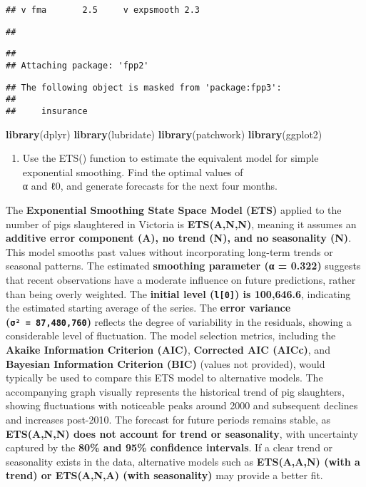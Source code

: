 \documentclass[
]{article}
\newenvironment{Shaded}{\begin{snugshade}}{\end{snugshade}}
\newcommand{\FunctionTok}[1]{\textcolor[rgb]{0.13,0.29,0.53}{\textbf{#1}}}
\newcommand{\NormalTok}[1]{#1}
\providecommand{\tightlist}{%
  \setlength{\itemsep}{0pt}\setlength{\parskip}{0pt}}
\begin{document}
\begin{verbatim}
## v fma       2.5     v expsmooth 2.3
\end{verbatim}

\begin{verbatim}
## 
\end{verbatim}

\begin{verbatim}
## 
## Attaching package: 'fpp2'
\end{verbatim}

\begin{verbatim}
## The following object is masked from 'package:fpp3':
## 
##     insurance
\end{verbatim}

\begin{Shaded}
\begin{Highlighting}[]
\FunctionTok{library}\NormalTok{(dplyr)}
\FunctionTok{library}\NormalTok{(lubridate)}
\FunctionTok{library}\NormalTok{(patchwork)}
\FunctionTok{library}\NormalTok{(ggplot2)}
\end{Highlighting}
\end{Shaded}

\begin{enumerate}
\def\labelenumi{\alph{enumi}.}
\tightlist
\item
  Use the ETS() function to estimate the equivalent model for simple
  exponential smoothing. Find the optimal values of\\
  α and ℓ0, and generate forecasts for the next four months.
\end{enumerate}

The \textbf{Exponential Smoothing State Space Model (ETS)} applied to
the number of pigs slaughtered in Victoria is \textbf{ETS(A,N,N)},
meaning it assumes an \textbf{additive error component (A), no trend
(N), and no seasonality (N)}. This model smooths past values without
incorporating long-term trends or seasonal patterns. The estimated
\textbf{smoothing parameter (α = 0.322)} suggests that recent
observations have a moderate influence on future predictions, rather
than being overly weighted. The \textbf{initial level
(\texttt{l{[}0{]}}) is 100,646.6}, indicating the estimated starting
average of the series. The \textbf{error variance
(\texttt{σ²\ =\ 87,480,760})} reflects the degree of variability in the
residuals, showing a considerable level of fluctuation. The model
selection metrics, including the \textbf{Akaike Information Criterion
(AIC)}, \textbf{Corrected AIC (AICc)}, and \textbf{Bayesian Information
Criterion (BIC)} (values not provided), would typically be used to
compare this ETS model to alternative models. The accompanying graph
visually represents the historical trend of pig slaughters, showing
fluctuations with noticeable peaks around 2000 and subsequent declines
and increases post-2010. The forecast for future periods remains stable,
as \textbf{ETS(A,N,N) does not account for trend or seasonality}, with
uncertainty captured by the \textbf{80\% and 95\% confidence intervals}.
If a clear trend or seasonality exists in the data, alternative models
such as \textbf{ETS(A,A,N) (with a trend) or ETS(A,N,A) (with
seasonality)} may provide a better fit.
\end{document}
